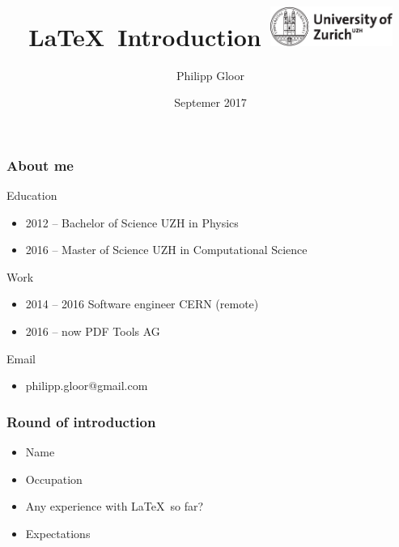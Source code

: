 \documentclass[10pt, a4paper]{beamer} %
\title{\LaTeX\ Introduction \hspace*{\fill}\includegraphics[width=4cm]{../../uzhpres/tex/uzh_logo_e_pos.pdf}}
\author{Philipp Gloor\inst{1}}
\institute[University of Zurich] %
{
  \inst{1}%
  philipp.gloor@gmail.com
  \\[\medskipamount]
      
}
\date{Septemer 2017} %
\begin{document}
    
    \begin{frame}
    \titlepage
    \end{frame}
\begin{frame}
\frametitle{About me}

\begin{block}{Education}
    \begin{itemize}
        \item 2012 -- Bachelor of Science UZH in Physics
        \item 2016 -- Master of Science UZH in Computational Science
    \end{itemize}
\end{block}

\begin{block}{Work}
    \begin{itemize}
        \item 2014 -- 2016 Software engineer CERN (remote)
        \item 2016 -- now PDF Tools AG
    \end{itemize}
\end{block}

\begin{block}{Email}
\begin{itemize}
    \item[] philipp.gloor@gmail.com
\end{itemize}
    
\end{block}
 
 
 
 
\end{frame}
\begin{frame}[t]\frametitle{Round of introduction}
    \begin{itemize}
        \item Name
        \item Occupation
        \item Any experience with \LaTeX\ so far?
        \item Expectations
    \end{itemize}
\end{frame}
\end{document}

